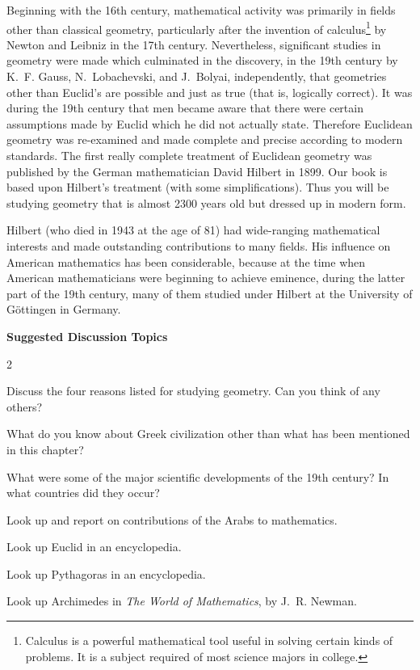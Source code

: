 \documentclass[11pt]{book}
\theoremstyle{bkplain}
\theoremstyle{XIplainnote}
\theoremstyle{bkplain}
\theoremstyle{bkplain}
\begin{document}
Beginning with the 16th century, mathematical activity was primarily in fields
other than classical geometry, particularly after the invention of
calculus\footnote{Calculus is a powerful mathematical tool useful in solving
certain kinds of problems. It is a subject required of most science majors in
college.}
by Newton and Leibniz in the 17th century. Nevertheless, significant studies in
geometry were made which culminated in the discovery, in the 19th century by
K.~F. Gauss, N.~Lobachevski, and J.~Bolyai, independently, that geometries other
than Euclid's are possible and just as true (that is, logically correct). It was
during the 19th century that men became aware that there were certain assumptions
made by Euclid which he did not actually state. Therefore Euclidean geometry was
re-examined and made complete and precise according to modern standards. The
first really complete treatment of Euclidean geometry was published by the German
mathematician David Hilbert in 1899. Our book is based upon Hilbert's treatment
(with some simplifications). Thus you will be studying geometry that is almost
2300 years old but dressed up in modern form.

Hilbert (who died in 1943 at the age of 81) had wide-ranging mathematical
interests and made outstanding contributions to many fields. His influence on
American mathematics has been considerable, because at the time when American
mathematicians were beginning to achieve eminence, during the latter part of the
19th century, many of them studied under Hilbert at the University of
G\"ottingen in Germany.

\begin{center}\bfseries Suggested Discussion Topics\end{center}
\nopagebreak
\begin{multicols}{2}
\begin{exlist}
\item Discuss the four reasons listed for studying geometry. Can you think of
      any others?
\item What do you know about Greek civilization other than what has been
      mentioned in this chapter?
\item What were some of the major scientific developments of the 19th century?
      In what countries did they occur?
\item Look up and report on contributions of the Arabs to mathematics.
\item Look up Euclid in an encyclopedia.
\item Look up Pythagoras in an encyclopedia.
\item Look up Archimedes in \emph{The World of Mathematics}, by J.~R. Newman.
\end{exlist}
\end{multicols}
\end{document}
